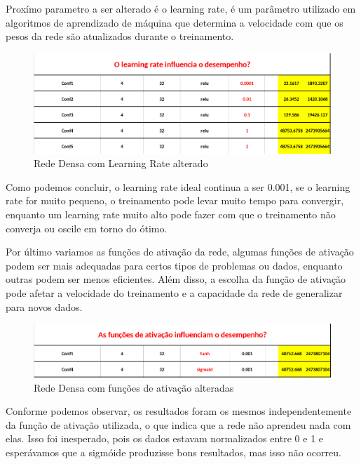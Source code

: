 \documentclass[10pt]{article}
\begin{document}
\vspace{1cm}

Proxímo parametro a ser alterado é o learning rate, é um parâmetro utilizado 
em algoritmos de aprendizado de máquina que determina a velocidade com que 
os pesos da rede são atualizados durante o treinamento.

\begin{figure}[htb]
  \centering
  \includegraphics[width=\linewidth]{img/deep_lr.png}
  \caption{Rede Densa com Learning Rate alterado}
  \label{fig:deep_lr}
\end{figure}

Como podemos concluir, o learning rate ideal continua a ser 0.001,
se o learning rate for muito pequeno, o treinamento pode levar muito 
tempo para convergir, enquanto um learning rate muito alto pode fazer 
com que o treinamento não converja ou oscile em torno do ótimo.

\newpage
Por último variamos as funções de ativação da rede, algumas funções de 
ativação podem ser mais adequadas para certos tipos de problemas ou dados, 
enquanto outras podem ser menos eficientes. Além disso, a escolha da função 
de ativação pode afetar a velocidade do treinamento e a capacidade da rede 
de generalizar para novos dados.

\begin{figure}[htb]
  \centering
  \includegraphics[width=\linewidth]{img/deep_ativacao.png}
  \caption{Rede Densa com funções de ativação alteradas}
  \label{fig:deep_ativacao}
\end{figure}

Conforme podemos observar, os resultados foram os mesmos independentemente 
da função de ativação utilizada, o que indica que a rede não aprendeu nada 
com elas. Isso foi inesperado, pois os dados estavam normalizados entre 0 e 1 
e esperávamos que a sigmóide produzisse bons resultados, mas isso não ocorreu.
\end{document}
